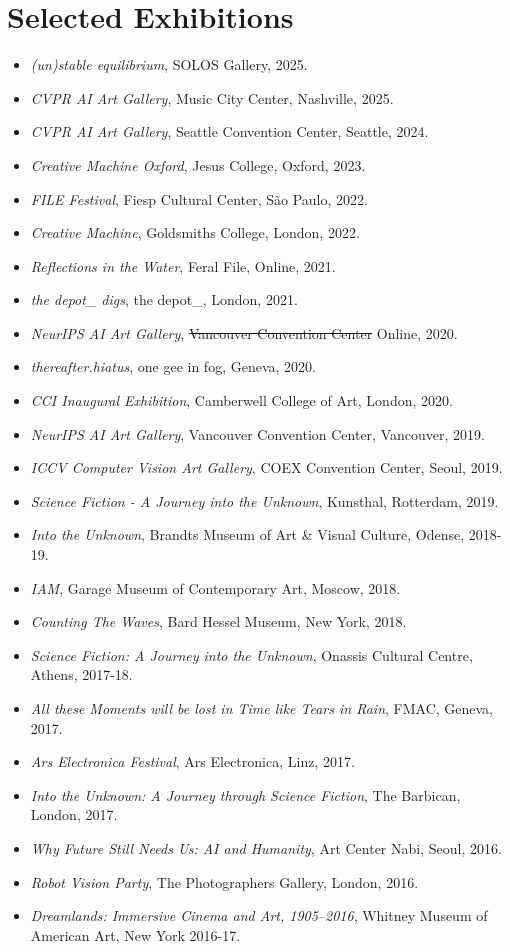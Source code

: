 \documentclass[letterpaper,11pt]{article}
\newcommand{\resumeItem}[2]{
  \item\small{
    \textbf{#1}{ #2 \vspace{-2pt}}
  }
}
\newcommand{\resumeSubItem}[2]{\resumeItem{#1}{#2}\vspace{-4pt}}
\newcommand{\resumeSubHeadingListStart}{\begin{itemize}[leftmargin=*]}
\newcommand{\resumeSubHeadingListEnd}{\end{itemize}}
\begin{document}
\section{Selected Exhibitions}
 \resumeSubHeadingListStart
  \resumeSubItem{}{\textit{(un)stable equilibrium}, SOLOS Gallery, 2025.}
  \resumeSubItem{}{\textit{CVPR AI Art Gallery}, Music City Center, Nashville, 2025.}
  \resumeSubItem{}{\textit{CVPR AI Art Gallery}, Seattle Convention Center, Seattle, 2024.}
  \resumeSubItem{}{\textit{Creative Machine Oxford}, Jesus College, Oxford, 2023.}
  \resumeSubItem{}{\textit{FILE Festival}, Fiesp Cultural Center, São Paulo, 2022.}
  \resumeSubItem{}{\textit{Creative Machine}, Goldsmiths College, London, 2022.}
  \resumeSubItem{}{\textit{Reflections in the Water}, Feral File, Online, 2021.}
  \resumeSubItem{}{\textit{the depot\_ digs}, the depot\_, London, 2021.}
  \resumeSubItem{}{\textit{NeurIPS AI Art Gallery}, \sout{Vancouver Convention Center} Online, 2020.}
  \resumeSubItem{}{\textit{thereafter.hiatus}, one gee in fog, Geneva, 2020. }
  \resumeSubItem{}{\textit{CCI Inaugural Exhibition}, Camberwell College of Art, London, 2020. }
  \resumeSubItem{}{\textit{NeurIPS AI Art Gallery}, Vancouver Convention Center, Vancouver, 2019.}
  \resumeSubItem{}{\textit{ICCV Computer Vision Art Gallery}, COEX Convention Center, Seoul, 2019. }
  \resumeSubItem{}{\textit{Science Fiction - A Journey into the Unknown}, Kunsthal, Rotterdam, 2019.}
  \resumeSubItem{}{\textit{Into the Unknown}, Brandts Museum of Art \& Visual Culture, Odense, 2018-19.}
  \resumeSubItem{}{\textit{IAM}, Garage Museum of Contemporary Art, Moscow, 2018.}
  \resumeSubItem{}{\textit{Counting The Waves}, Bard Hessel Museum, New York, 2018. }
  \resumeSubItem{}{\textit{Science Fiction: A Journey into the Unknown}, Onassis Cultural Centre, Athens, 2017-18.}
  \resumeSubItem{}{\textit{All these Moments will be lost in Time like Tears in Rain}, FMAC, Geneva, 2017. }
  \resumeSubItem{}{\textit{Ars Electronica Festival}, Ars Electronica, Linz, 2017. }
  \resumeSubItem{}{\textit{Into the Unknown: A Journey through Science Fiction}, The Barbican, London, 2017.}
  \resumeSubItem{}{\textit{Why Future Still Needs Us: AI and Humanity}, Art Center Nabi, Seoul, 2016.}
  \resumeSubItem{}{\textit{Robot Vision Party}, The Photographers Gallery, London, 2016.}
  \resumeSubItem{}{\textit{Dreamlands: Immersive Cinema and Art, 1905–2016}, Whitney Museum of American Art, New York 2016-17.}
 \resumeSubHeadingListEnd

\end{document}
